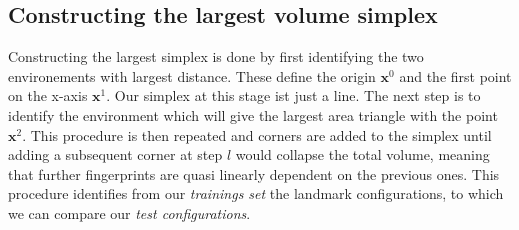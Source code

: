 \subsection{Constructing the largest volume simplex}
Constructing the largest simplex is done by first identifying the two environements with largest distance. These define the origin $\mathbf{x}^0$ and the first point on the x-axis $\mathbf{x}^1$. Our simplex at this stage ist just a line. The next step is to identify the environment which will give the largest area triangle with the point $\mathbf{x}^2$. This procedure is then repeated and corners are added to the simplex until adding a subsequent corner at step $l$ would collapse the total volume, meaning that further fingerprints are quasi linearly dependent on the previous ones. This procedure identifies from our \emph{trainings set} the landmark configurations, to which we can compare our \emph{test configurations}.
